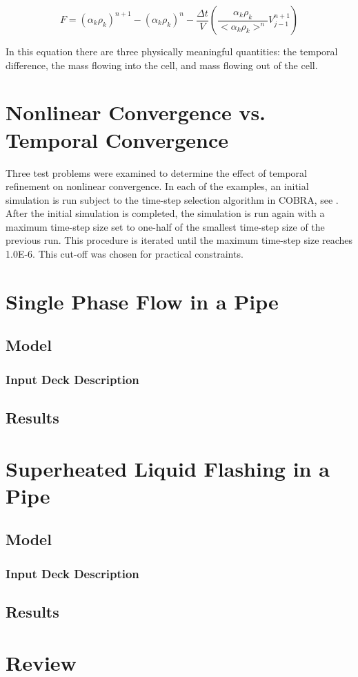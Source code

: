 \begin{equation}
F = \left(\alpha_k \rho_k\right)^{n+1} - \left( \alpha_k \rho_k \right)^n - \frac{\Delta t}{V} \left( \frac{\alpha_k \rho_k }{<\alpha_k \rho_k>^n} V^{n+1}_{j-1} \right)
\end{equation}

In this equation there are three physically meaningful quantities: the temporal difference, the mass flowing into the cell, and mass flowing out of the cell.

\section{Nonlinear Convergence vs. Temporal Convergence}
\label{sect:nonlinear_temporal_convergence}

Three test problems were examined to determine the effect of temporal refinement on nonlinear convergence.
In each of the examples, an initial simulation is run subject to the time-step selection algorithm in COBRA, see .
After the initial simulation is completed, the simulation is run again with a maximum time-step size set to one-half of the smallest time-step size of the previous run.
This procedure is iterated until the maximum time-step size reaches 1.0E-6.
This cut-off was chosen for practical constraints.

\section{Single Phase Flow in a Pipe}
\label{sect:single_numerical_experiment}
\subsection{Model}
\label{subsect:single_model}
\subsubsection{Input Deck Description}
\label{subsect:single_input_deck}
\subsection{Results}
\label{subsect:single_results}

\section{Superheated Liquid Flashing in a Pipe}
\label{sect:flashing_numerical_experiment}
\subsection{Model}
\label{subsect:flashing_model}
\subsubsection{Input Deck Description}
\label{subsect:flashing_input_deck}
\subsection{Results}
\label{subsect:flashing_results}


\section{Review}
\label{sect:scaling_review}
